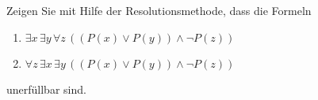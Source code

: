 
\begin{exercise}[182]

Zeigen Sie mit Hilfe der Resolutionsmethode, dass die Formeln
\begin{enumerate}
  \item $\exists x\, \exists y\, \forall z\, ((P(x) \lor P(y)) \land \neg P(z))$
  \item $\forall z\, \exists x\, \exists y\, ((P(x) \lor P(y)) \land \neg P(z))$
\end{enumerate}
unerfüllbar sind.
\end{exercise}


\begin{solution}

  \phantom{}

\end{solution}
